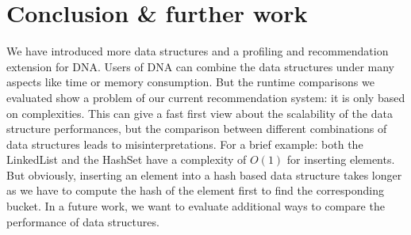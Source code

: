 \section{Conclusion \& further work}
	We have introduced more data structures and a profiling and recommendation extension for
	DNA. Users of DNA can combine the data structures under many aspects like time or memory
	consumption. But the runtime comparisons we evaluated show a problem of our current
	recommendation system: it is only based on complexities. This can give a fast first view
	about the scalability of the data structure performances, but the comparison between
	different combinations of data structures leads to misinterpretations. For a brief
	example: both the LinkedList and the HashSet have a complexity of $O(1)$ for inserting
	elements. But obviously, inserting an element into a hash based data structure takes
	longer as we have to compute the hash of the element first to find the corresponding
	bucket. In a future work, we want to evaluate additional ways to compare the performance
	of data structures.
